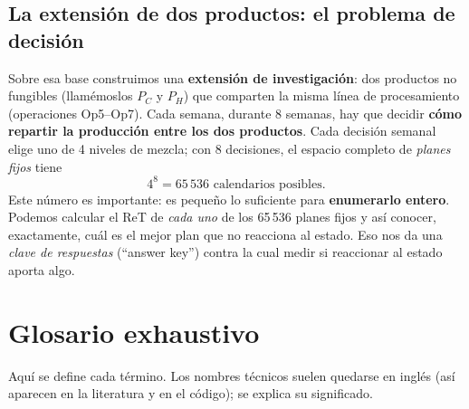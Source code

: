 \documentclass[11pt,a4paper]{article}
\begin{document}
\subsection{La extensión de dos productos: el problema de decisión}\label{sec:extension}
Sobre esa base construimos una \textbf{extensión de investigación}: dos productos no fungibles
(llamémoslos $P_C$ y $P_H$) que comparten la misma línea de procesamiento (operaciones Op5--Op7). Cada
semana, durante 8 semanas, hay que decidir \textbf{cómo repartir la producción entre los dos
productos}. Cada decisión semanal elige uno de 4 niveles de mezcla; con 8 decisiones, el espacio
completo de \emph{planes fijos} tiene
\[
4^{8} = 65\,536 \text{ calendarios posibles.}
\]
Este número es importante: es pequeño lo suficiente para \textbf{enumerarlo entero}. Podemos calcular
el ReT de \emph{cada uno} de los 65\,536 planes fijos y así conocer, exactamente, cuál es el mejor plan
que no reacciona al estado. Eso nos da una \emph{clave de respuestas} (``answer key'') contra la cual
medir si reaccionar al estado aporta algo.

\section{Glosario exhaustivo}\label{sec:glosario}
Aquí se define cada término. Los nombres técnicos suelen quedarse en inglés (así aparecen en la
literatura y en el código); se explica su significado.
\end{document}
